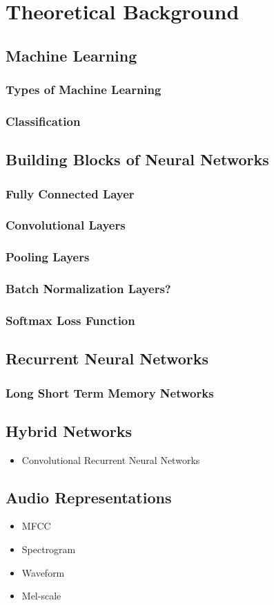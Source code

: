 \section{Theoretical Background}

\subsection{Machine Learning}
\subsubsection{Types of Machine Learning}
\subsubsection{Classification}

\subsection{Building Blocks of Neural Networks}

\subsubsection{Fully Connected Layer}
\subsubsection{Convolutional Layers}
\subsubsection{Pooling Layers}
\subsubsection{Batch Normalization Layers?}
\subsubsection{Softmax Loss Function}

\subsection{Recurrent Neural Networks}
\subsubsection{Long Short Term Memory Networks}

\subsection{Hybrid Networks}
    \begin{itemize}
        \item Convolutional Recurrent Neural Networks
    \end{itemize}

\subsection{Audio Representations}
    \begin{itemize}
        \item MFCC
        \item Spectrogram
        \item Waveform
        \item Mel-scale
    \end{itemize}